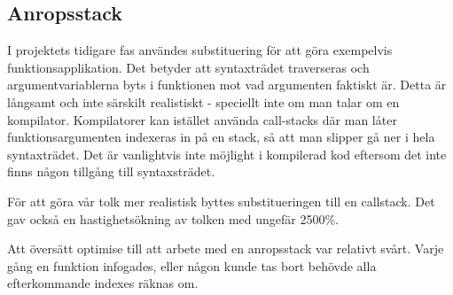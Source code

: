 \documentclass[Rapport]{subfiles}
\begin{document}
\subsection{Anropsstack}

I projektets tidigare fas användes substituering för att göra exempelvis funktionsapplikation.
Det betyder att syntaxträdet traverseras och argumentvariablerna byts i funktionen
mot vad argumenten faktiskt är. Detta är långsamt och inte särskilt realistiskt - 
speciellt inte om man talar om en kompilator. Kompilatorer kan istället använda call-stacks
där man låter funktionsargumenten indexeras in på en stack, så att man slipper
gå ner i hela syntaxträdet. Det är vanlightvis inte möjlight i kompilerad kod eftersom
det inte finns någon tillgång till syntaxsträdet.

För att göra vår tolk mer realistisk byttes substitueringen till en callstack. 
Det gav också en hastighetsökning av tolken med ungefär 2500\%.


Att översätt optimise till att arbete med en anropsstack var relativt svårt. Varje gång en funktion infogades, eller någon  kunde tas bort behövde alla efterkommande indexes räknas om. 
\end{document}
